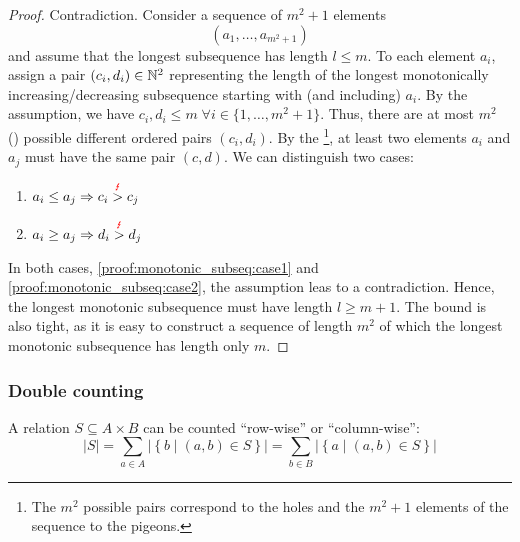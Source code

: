\begin{proof}
Contradiction.
Consider a sequence of \(m^{2}+1\) elements
\[
\left(a_1, \ldots, a_{m^{2}+1}\right)
\]
and assume that the longest subsequence has length \(l\leq m\).
To each element \(a_i\), assign a pair \((c_i, d_i) \in \mathbb{N}^2\) representing the length of the longest monotonically increasing/decreasing subsequence starting with (and including) \(a_i\).
By the assumption, we have \(c_i, d_i \leq m \; \forall i \in \{1, \ldots, m^{2}+1\}\).
Thus, there are at most \(m^{2}\) () possible different ordered pairs \((c_i, d_i)\).
By the \footnote{The \(m^2\) possible pairs correspond to the holes and the \(m^2+1\) elements of the sequence to the pigeons.}, at least two elements \(a_i\) and \(a_j\) must have the same pair \((c, d)\).
We can distinguish two cases:
\begin{enumerate}[partopsep=0em, topsep=0em, label=(\roman*)]
\item \(a_i \leq a_j \Rightarrow c_i \overset{\text{\textcolor{red}{\Lightning}}}{>} c_j\) \label{proof:monotonic_subseq:case1}
\item \(a_i \geq a_j \Rightarrow d_i \overset{\text{\textcolor{red}{\Lightning}}}{>} d_j\) \label{proof:monotonic_subseq:case2}
\end{enumerate}
In both cases, \ref{proof:monotonic_subseq:case1} and \ref{proof:monotonic_subseq:case2}, the assumption leas to a contradiction.
Hence, the longest monotonic subsequence must have length \(l \geq m+1\).
The bound is also tight, as it is easy to construct a sequence of length \(m^{2}\) of which the longest monotonic subsequence has length only \(m\).
\end{proof}


\subsubsection{Double counting}
\label{subsubsec:double_counting}

A relation $S\subseteq A\times B$ can be counted ``row-wise'' or
``column-wise'':
\[
  \left| S \right| =  \sum_{a\in A} \left|\left\{b\mid(a,b)\in S\right\}\right| = \sum_{b\in B} \left|\left\{a\mid(a,b)\in S\right\}\right|
\]

